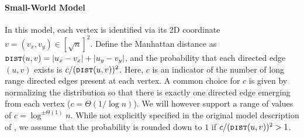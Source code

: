 \paragraph*{Small-World Model}
In this model, each vertex is identified via its 2D coordinate $v = (v_x, v_y) \in [\sqrt{n}]^2$.
Define the Manhattan distance as $\texttt{\textsc{dist}}(u,v)=|u_x-v_x|+|u_y-v_y|$,
and the probability that each directed edge $(u,v)$ exists is $c/(\texttt{\textsc{dist}}(u,v))^{2}$.
Here, $c$ is an indicator of the number of long range directed edges present at each vertex.
A common choice for $c$ is given by normalizing the distribution so that there is exactly one directed edge emerging from each vertex ($c = \Theta(1/\log n)$).
We will however support a range of values of $c=\log^{\pm\Theta(1)}n$.
While not explicitly specified in the original model description of \cite{kleinberg},
we assume that the probability is rounded down to $1$ if $c/(\texttt{\textsc{dist}}(u,v))^{2} > 1$.


